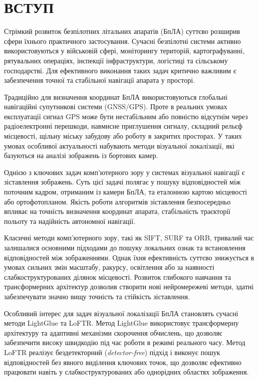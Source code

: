 \documentclass[a4paper, 12pt, titlepage]{article}
\begin{document}
\newpage
\section*{\centering ВСТУП}

Стрімкий розвиток безпілотних літальних апаратів (БпЛА) суттєво розширив сфери їхнього практичного застосування. Сучасні безпілотні системи активно використовуються у військовій сфері, моніторингу територій, картографуванні, рятувальних операціях, інспекції інфраструктури, логістиці та сільському господарстві. Для ефективного виконання таких задач критично важливим є забезпечення точної та стабільної навігації апарата у просторі.

Традиційно для визначення координат БпЛА використовуються глобальні навігаційні супутникові системи (GNSS/GPS). Проте в реальних умовах експлуатації сигнал GPS може бути нестабільним або повністю відсутнім через радіоелектронні перешкоди, навмисне приглушення сигналу, складний рельєф місцевості, щільну міську забудову або роботу в закритих просторах. У таких умовах особливої актуальності набувають методи візуальної локалізації, які базуються на аналізі зображень із бортових камер.

Однією з ключових задач комп’ютерного зору у системах візуальної навігації є зіставлення зображень. Суть цієї задачі полягає у пошуку відповідностей між поточним кадром, отриманим із камери БпЛА, та еталонною картою місцевості або ортофотопланом. Якість роботи алгоритмів зіставлення безпосередньо впливає на точність визначення координат апарата, стабільність траєкторії польоту та надійність автономної навігації.

Класичні методи комп’ютерного зору, такі як SIFT, SURF та ORB, тривалий час залишалися основними підходами до пошуку локальних ознак та встановлення відповідностей між зображеннями. Однак їхня ефективність суттєво знижується в умовах сильних змін масштабу, ракурсу, освітлення або за наявності слабкоструктурованих ділянок місцевості. Розвиток глибокого навчання та трансформерних архітектур дозволив створити нові нейромережеві методи, здатні забезпечувати значно вищу точність та стійкість зіставлення.

Особливий інтерес для задач візуальної локалізації БпЛА становлять сучасні методи LightGlue та LoFTR. Метод LightGlue використовує трансформерну архітектуру та адаптивні механізми скорочення обчислень, що дозволяє забезпечити високу швидкодію під час роботи в режимі реального часу. Метод LoFTR реалізує бездетекторний (\textit{detector-free}) підхід і виконує пошук відповідностей без явного виділення ключових точок, що дозволяє ефективно працювати навіть у слабкоструктурованих або однорідних областях зображення.
\end{document}
